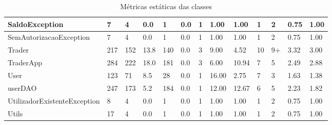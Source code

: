 \begin{table}[ht]
\begin{adjustbox}{width=1\textwidth}
\begin{tabular}{|l|l|l|l|l|l|l|l|l|l|l|l|l|}
SaldoException               & 7            & 4          & 0.0             & 1        & 0.0            & 1       & 1.00            & 1.00                       & 1                   & 2                   & 0.75               & 1.00               \\ \hline
SemAutorizacaoException      & 7            & 4          & 0.0             & 1        & 0.0            & 1       & 1.00            & 1.00                       & 1                   & 2                   & 0.75               & 1.00               \\ \hline
Trader                       & 217          & 152        & 13.8            & 140      & 0.0            & 3       & 9.00            & 4.52                       & 10                  & 9+                  & 3.32               & 3.00               \\ \hline
TraderApp                    & 284          & 222        & 18.0            & 181      & 0.0            & 3       & 6.00            & 10.94                      & 7                   & 5                   & 2.49               & 2.88               \\ \hline
User                         & 123          & 71         & 8.5             & 28       & 0.0            & 1       & 16.00           & 2.75                       & 7                   & 3                   & 1.63               & 1.38               \\ \hline
userDAO                      & 247          & 173        & 5.2             & 184      & 0.0            & 1       & 12.00           & 12.67                      & 6                   & 5                   & 2.23               & 1.82               \\ \hline
UtilizadorExistenteException & 8            & 4          & 0.0             & 1        & 0.0            & 1       & 1.00            & 1.00                       & 1                   & 2                   & 0.75               & 1.00               \\ \hline
Utils                        & 17           & 4          & 0.0             & 1        & 0.0            & 1       & 1.00            & 1.00                       & 1                   & 2                   & 0.75               & 1.00               \\ \hline
\end{tabular}
\end{adjustbox}
\caption{Métricas estáticas das classes}
\end{table}

